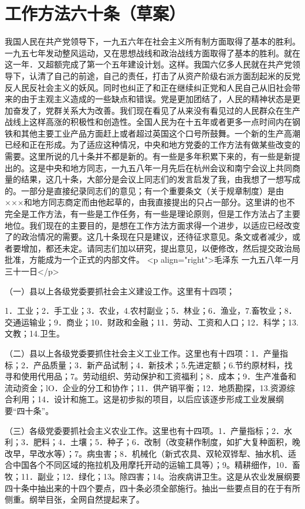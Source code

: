 \section[工作方法六十条（草案）（一九五八年一月三十一日）]{工作方法六十条（草案）}


我国人民在共产党领导下，一九五六年在社会主义所有制方面取得了基本的胜利。一九五七年发动整风运动，又在思想战线和政治战线方面取得了基本的胜利。就在这一年．又超额完成了第一个五年建设计划。这样。我国六亿多人民就在共产党领导下，认清了自己的前途，自己的责任，打击了从资产阶级右派方面刮起米的反党反人民反社会主义的妖风。同时也纠正了和正在继续纠正党和人民自己从旧社会带来的由于主观主义造成的一些缺点和错误。党是更加团结了，人民的精神状态是更加奋发了，党群关系大为改善。我们现在看见了从来没有看见过的人民群众在生产战线上这样高涨的积极性和创造性。全国人民为在十五年或者更多一点时间内在钢铁和其他主要工业产品方面赶上或者超过英国这个口号所鼓舞。一个新的生产高潮已经和正在形成。为了适应这种情况，中央和地方党委的工作方法有做某些改变的需要。这里所说的几十条并不都是新的。有一些是多年积累下来的，有一些是新提出的。这是中央和地方同志，一九五八年一月先后在杭州会议和南宁会议上共同商量的结果，这几十条，大部分是会议上同志们的发言启发了我，由我想了一想写成的。一部分是直接纪录同志们的意见；有一个重要条文（关于规章制度）是由×××和地方同志商定而由他起草的，由我直接提出的只占一部分。这里讲的也不完全是工作方法，有一些是工作任务，有一些是理论原则，但是工作方法占了主要地位。我们现在的主要目的，是想在工作方法方面求得一个进步，以适应已经改变了的政治情况的需要。这几十条现在只是建议，还待征求意见。条文或者减少，或者要增加，都还未定。请同志们加以研究，提出意见，以便修改，然后提交政治局批准，方能成为一个正式的内部文件。
<p align="right">毛泽东
一九五八年一月三十一日</p>

（一）县以上各级党委要抓社会主义建设工作。这里有十四项；

1．工业；2．手工业；3．农业，4.农村副业；5．林业；6．渔业，7.畜牧业；8．交通运输业；9．商业；10．财政和金融；11．劳动、工资和人口；12．科学；13.文教；14.卫生。

（二）县以上各级党委要抓住社会主义工业工作。这里也有十四项：1．产量指标；2．产品质量；3．新产品试制；4．新技术；5.先进定额；6.节约原材料，找寻和使用代用品；7。劳动组织、劳动保护和工资福利；8．成本；9．生产准备和流动资金；lO．企业的分工和协作；11．供产销平衡；12．地质勘探，13.资源综合利用；14．设计和施工。这是初步拟的项目，以后应该逐步形成工业发展纲要“四十条”。

（三）各级党委要抓社会主义农业工作。这里也有十四项。1．产量指标；2．水利；3．肥料；4．土壤；5．种子；6．改制（改变耕作制度，如扩大复种面积，晚改早，早改水等）；7。病虫害；8．机械化（新式农具、双轮双铧犁、抽水机、适合中国各个不同区域的拖拉机及用摩托开动的运输工具等）；9。精耕细作，10．畜牧；11．副业；12．绿化；13。除四害；14。治疾病讲卫生。这是从农业发展纲要四十条中抽出来的十四个要点，四十条必须全部施行。抽出一些要点目的在于有所侧重。纲举目张，全网自然提起来了。

